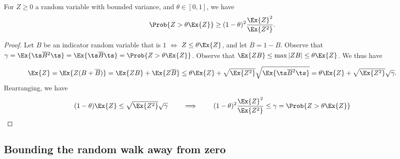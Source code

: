 \begin{theorem}
    For $Z \geq 0$  a random variable with bounded variance, and
    $\theta \in [0,1]$, we have
    \begin{equation*}
        \Prob{Z > \theta \Ex{Z}\bigr.}
        \geq%
        (1-\theta)^2 \frac{\Ex{Z}^2}{\Ex{Z^2}}.
    \end{equation*}
\end{theorem}
\begin{proof}
    Let $B$ be an indicator random variable that is $1$ $\iff$
    $Z \leq \theta \Ex{Z}$, and let $\overline{B} = 1- B$. Observe
    that
    $\gamma = \Ex{\ts\smash{\smash{\overline{B}}^2}\ts}\Bigr.=
    \Ex{\ts\smash{\overline{B}}\ts\bigr.} = \Prob{Z > \theta
       \Ex{Z}\bigr.}$.  Observe that
    $\Ex{Z B \bigr.} \leq \max |Z B| \leq \theta \Ex{Z}$.  We thus
    have
    \begin{align*}
      \Ex{Z} = \Ex{Z (B + \overline{B}) }
      =%
      \Ex{Z B \bigr.} + \Ex{ \smash{Z \overline{B} } \bigr.}
      \leq
      \theta \Ex{Z} +
      \sqrt{\Ex{Z^2}} \sqrt{ \Ex{\ts\smash{\smash{\overline{B}}^2}\ts } \bigr. }
      =
      \theta \Ex{Z} +
      \sqrt{\Ex{Z^2}}  \sqrt{\gamma}.
    \end{align*}
    Rearranging, we have
    \begin{align*}
      (1-\theta)\Ex{Z}
      \leq
      \sqrt{\Ex{Z^2}}  \sqrt{\gamma}
      \qquad\implies\qquad
      (1-\theta)^2\frac{\Ex{Z}^2}{\Ex{Z^2}}
      \leq
      \gamma
      =
      \Prob{Z > \theta
      \Ex{Z}\bigr.}
    \end{align*}
\end{proof}


\subsection{Bounding the random walk away from zero}


